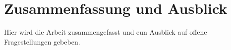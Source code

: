 \chapter{Zusammenfassung und Ausblick}

Hier wird die Arbeit zusammengefasst und eun Ausblick auf offene
Fragestellungen gebeben.

